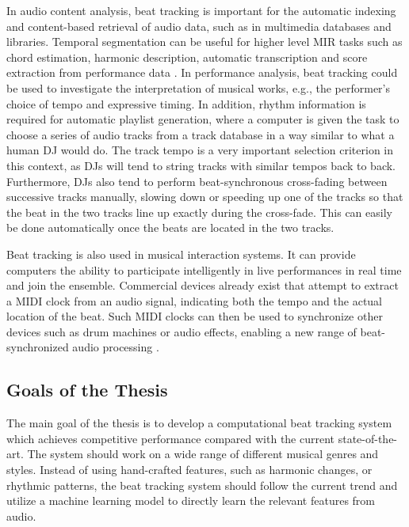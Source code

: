 \documentclass{scrartcl}
\begin{document}

In audio content analysis, beat tracking is important for the automatic indexing and content-based retrieval of audio data, such as in multimedia databases and libraries. Temporal segmentation can be useful for higher level MIR tasks such as chord estimation, harmonic description, automatic transcription and score extraction from performance data \cite{Bello2005b}. In performance analysis, beat tracking could be used to investigate the interpretation of musical works, e.g., the performer's choice of tempo and expressive timing. In addition, rhythm information is required for automatic playlist generation, where a computer is given the task to choose a series of audio tracks from a track database in a way similar to what a human DJ would do. The track tempo is a very important selection criterion in this context, as DJs will tend to string tracks with similar tempos back to back. Furthermore, DJs also tend to perform beat-synchronous cross-fading between successive tracks manually, slowing down or speeding up one of the tracks so that the beat in the two tracks line up exactly during the cross-fade. This can easily be done automatically once the beats are located in the two tracks.


Beat tracking is also used in musical interaction systems. It can provide computers the ability to participate intelligently in live performances in real time and join the ensemble. Commercial devices already exist that attempt to extract a MIDI clock from an audio signal, indicating both the tempo and the actual location of the beat. Such MIDI clocks can then be used to synchronize other devices such as drum machines or audio effects, enabling a new range of beat-synchronized audio processing \cite{Robertson2007}. 
\newpage

\subsection{Goals of the Thesis}

The main goal of the thesis is to develop a computational beat tracking system which achieves competitive performance compared with the current state-of-the-art. The system should work on a wide range of different musical genres and styles. Instead of using hand-crafted features, such as harmonic changes, or rhythmic patterns, the beat tracking system should follow the current trend and utilize a machine learning model to directly learn the relevant features from audio. 
\end{document}
